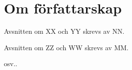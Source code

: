 \tableofcontents

\section{Om författarskap}
Avsnitten om XX och YY skrevs av NN.

Avsnitten om ZZ och WW skrevs av MM.

osv..
